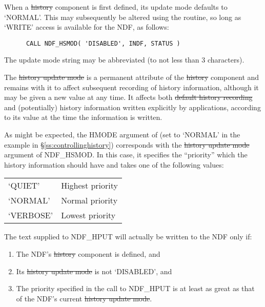 When a \st{history\/} component is first defined, its update mode
defaults to `NORMAL'. This may subsequently be altered using the
 routine, so long as `WRITE' access is available for the
NDF, as follows:

\small
\begin{verbatim}
      CALL NDF_HSMOD( 'DISABLED', INDF, STATUS )
\end{verbatim}
\normalsize

The update mode string may be abbreviated (to not less than 3 characters).

The \st{history update mode\/} is a permanent attribute of the
\st{history\/} component and remains with it to affect subsequent
recording 
of history information, although it may be given a new value at any
time.  It affects both \st{default history recording\/} and (potentially)
history information written explicitly by applications, according to
its value at the time the information is written.

As might be expected, the HMODE argument of  (set to `NORMAL'
in the example in \S\ref{ss:controllinghistory}) corresponds with the
\st{history update mode\/} argument of NDF\_HSMOD. In this case, it
specifies the ``priority'' which the history information should have
and takes one of the following values:

\begin{center}
\begin{tabular}{ll}
`QUIET' & Highest priority\\
`NORMAL' & Normal priority\\
`VERBOSE' & Lowest priority
\end{tabular}
\end{center}

The text supplied to NDF\_HPUT will actually be written to the NDF
only if:

\begin{enumerate}

\item The NDF's \st{history\/} component is defined, and

\item Its \st{history update mode\/} is not `DISABLED', and

\item The priority specified in the call to NDF\_HPUT is at least as great as
that of the NDF's current \st{history update mode}.

\end{enumerate}

